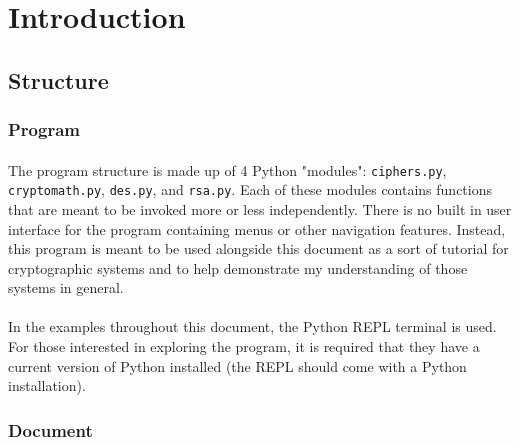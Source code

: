 \documentclass[12pt,a4paper]{article}
\begin{document}
\newpage

\tableofcontents
{}
\newpage
\setcounter{page}{1}

\section{Introduction}


\subsection{Structure}
\subsubsection{Program}
\paragraph{}
The program structure is made up of 4 Python "modules": \verb|ciphers.py|, 
\verb|cryptomath.py|, \verb|des.py|, and \verb|rsa.py|.  Each of these 
modules contains functions that are meant to be invoked more or less 
independently.  There is no built in user interface for the program containing 
menus or other navigation features.  Instead, this program is meant to be used 
alongside this document as a sort of tutorial for cryptographic systems and to 
help demonstrate my understanding of those systems in general.

\paragraph{}
In the examples throughout this document, the Python REPL terminal is used.  
For those interested in exploring the program, it is required that they have 
a current version of Python installed (the REPL should come with a Python 
installation).

\subsubsection{Document}
\end{document}
